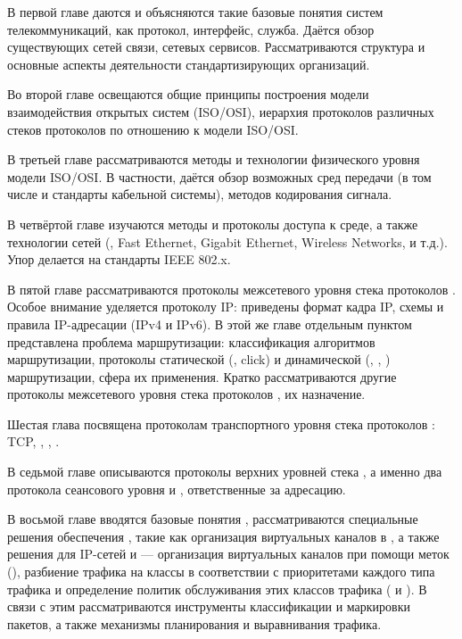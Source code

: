 В первой главе даются и объясняются такие базовые понятия систем
телекоммуникаций, как протокол, интерфейс, служба. Даётся обзор
существующих сетей связи, сетевых сервисов. Рассматриваются структура
и основные аспекты деятельности стандартизирующих организаций.

Во второй главе освещаются общие принципы построения модели
взаимодействия открытых систем (ISO/OSI), иерархия протоколов
различных стеков протоколов по отношению к модели ISO/OSI.

В третьей главе рассматриваются методы и технологии физического уровня
модели ISO/OSI. В частности, даётся обзор возможных сред передачи (в
том числе и стандарты кабельной системы), методов кодирования сигнала.

В четвёртой главе изучаются методы и протоколы доступа к среде, а
также технологии сетей (, Fast Ethernet, Gigabit
Ethernet, Wireless Networks,  и т.д.). Упор делается на
стандарты IEEE 802.x.

В пятой главе рассматриваются протоколы межсетевого уровня стека
протоколов . Особое внимание уделяется протоколу IP:
приведены формат кадра IP, схемы и правила IP-адресации
(IPv4 и IPv6).  В этой же главе
отдельным пунктом представлена проблема маршрутизации: классификация
алгоритмов маршрутизации, протоколы статической (,
click) и динамической (, , )
маршрутизации, сфера их применения. Кратко рассматриваются другие
протоколы межсетевого уровня стека протоколов , их
назначение.

Шестая глава посвящена протоколам транспортного уровня стека
протоколов : TCP, , , .

В седьмой главе описываются протоколы верхних уровней стека
, а именно два протокола сеансового уровня
 и , ответственные за адресацию.


В восьмой главе вводятся базовые понятия , рассматриваются
специальные решения обеспечения , такие как организация
виртуальных каналов в , а также решения для IP-сетей и
 --- организация виртуальных каналов при помощи меток
(), разбиение трафика на классы в соответствии с
приоритетами каждого типа трафика и определение политик обслуживания
этих классов трафика ( и ). В связи с
этим рассматриваются инструменты классификации и маркировки пакетов, а
также механизмы планирования и выравнивания трафика.

